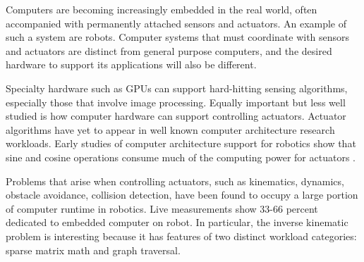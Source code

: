 Computers are becoming increasingly embedded in the real world, often accompanied with permanently attached sensors and actuators. An example of such a system are robots. Computer systems that must coordinate with sensors and actuators are distinct from general purpose computers, and the desired hardware to support its applications will also be different.

Specialty hardware such as GPUs can support hard-hitting sensing algorithms, especially those that involve image processing. Equally important but less well studied is how computer hardware can support controlling actuators. Actuator algorithms have yet to appear in well known computer architecture research workloads. Early studies of computer architecture support for robotics show that sine and cosine operations consume much of the computing power for actuators \cite{Caselli}.


Problems that arise when controlling actuators, such as kinematics, dynamics, obstacle avoidance, collision detection, have been found to occupy a large portion of computer runtime in robotics. Live measurements show 33-66 percent dedicated to embedded computer on robot. In particular, the inverse kinematic problem is interesting because it has features of two distinct workload categories: sparse matrix math and graph traversal.